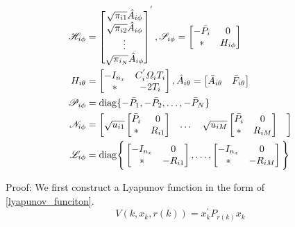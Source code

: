 \documentclass[conference]{IEEEtran}
\begin{document}
\begin{equation}\notag
	\begin{aligned}
		\mathscr{H}_{i\phi}&=\begin{bmatrix}
			\sqrt{\pi_{i1}}\hat{A}_{i\phi}\\
			\sqrt{\pi_{i2}}\hat{A}_{i\phi}\\
			\vdots\\
			\sqrt{\pi_{i_N}}\hat{A}_{i\phi}
		\end{bmatrix}^{'},
		\mathscr{S}_{i\phi} = \begin{bmatrix}
			-\bar{P}_{i}&0\\
			*&H_{i\phi}
		\end{bmatrix}\\
		H_{i\theta}&=\begin{bmatrix}
			-I_{n_x}&C^{'}_{i}\varOmega_{i}T_{i} \\
			*&-2T_{i}
		\end{bmatrix},
		\hat{A}_{i\theta}=\begin{bmatrix}
			\bar{A}_{i\theta}&\bar{F}_{i\theta}
		\end{bmatrix}  \\
		\mathscr{P}_{i\phi}&=\mathrm{diag} \{-\bar{P}_{1},-\bar{P}_{2},\dots,-\bar{P}_{N}  \}\\
		\mathscr{N}_{i\phi}&=\begin{bmatrix}
				\sqrt{u_{i1}}\begin{bmatrix}
				\bar{P}_{i}&0\\
				*&R_{i1}
			\end{bmatrix}&
			\dots&	
			\sqrt{u_{iM}}\begin{bmatrix}
				\bar{P}_{i}&0\\
				*&R_{iM}
			\end{bmatrix}&
		\end{bmatrix} \\
		\mathscr{L}_{i\phi}&=\mathrm{diag}\Bigg\{\begin{bmatrix}
			-I_{n_x}&0\\
			*&-R_{i1}
		\end{bmatrix},\dots,
		\begin{bmatrix}
			-I_{n_x}&0\\
			*&-R_{iM}
		\end{bmatrix}  \Bigg\} 
	\end{aligned}
\end{equation}

Proof: We first construct a Lyapunov function in the form of \eqref{lyapunov_funciton}.
\begin{equation}\label{lyapunov_funciton} 
	V(k,x_k,r(k))=x^{'}_{k}P_{r(k)}x_{k}
\end{equation}
\end{document}
